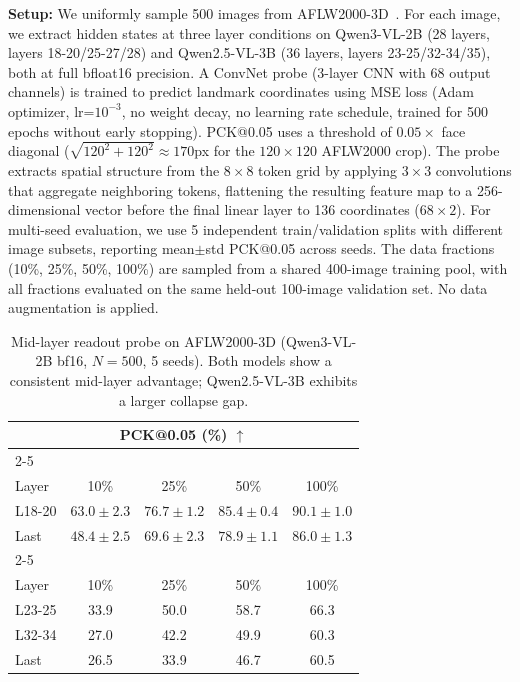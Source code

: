 \documentclass[10pt,twocolumn,letterpaper]{article}
\begin{document}
\textbf{Setup:} We uniformly sample 500 images from AFLW2000-3D~\cite{Zhu2019face}. For each image, we extract hidden states at three layer conditions on Qwen3-VL-2B (28 layers, layers 18-20/25-27/28) and Qwen2.5-VL-3B (36 layers, layers 23-25/32-34/35), both at full bfloat16 precision. A ConvNet probe (3-layer CNN with 68 output channels) is trained to predict landmark coordinates using MSE loss (Adam optimizer, lr=$10^{-3}$, no weight decay, no learning rate schedule, trained for 500 epochs without early stopping). PCK@0.05 uses a threshold of $0.05\times$ face diagonal ($\sqrt{120^2+120^2} \approx 170$px for the $120\times120$ AFLW2000 crop). The probe extracts spatial structure from the $8\times8$ token grid by applying $3\times3$ convolutions that aggregate neighboring tokens, flattening the resulting feature map to a 256-dimensional vector before the final linear layer to 136 coordinates ($68\times2$). For multi-seed evaluation, we use 5 independent train/validation splits with different image subsets, reporting mean$\pm$std PCK@0.05 across seeds. The data fractions (10\%, 25\%, 50\%, 100\%) are sampled from a shared 400-image training pool, with all fractions evaluated on the same held-out 100-image validation set. No data augmentation is applied.

\begin{table}[t]
\centering
\small
\setlength{\tabcolsep}{3pt}
\caption{Mid-layer readout probe on AFLW2000-3D (Qwen3-VL-2B bf16, $N=500$, 5 seeds). Both models show a consistent mid-layer advantage; Qwen2.5-VL-3B exhibits a larger collapse gap.}
\label{tab:probe}
\begin{tabular}{lcccc}
\toprule
\multicolumn{5}{c}{\textbf{PCK@0.05 (\%) $\uparrow$}} \\
\cmidrule(lr){2-5}
\multicolumn{5}{c}{Qwen3-VL-2B} \\
Layer & 10\% & 25\% & 50\% & 100\% \\
\midrule
L18-20 & $63.0\pm2.3$ & $76.7\pm1.2$ & $85.4\pm0.4$ & $90.1\pm1.0$ \\
Last & $48.4\pm2.5$ & $69.6\pm2.3$ & $78.9\pm1.1$ & $86.0\pm1.3$ \\
\cmidrule(lr){2-5}
\multicolumn{5}{c}{Qwen2.5-VL-3B} \\
Layer & 10\% & 25\% & 50\% & 100\% \\
\midrule
L23-25 & 33.9 & 50.0 & 58.7 & 66.3 \\
L32-34 & 27.0 & 42.2 & 49.9 & 60.3 \\
Last & 26.5 & 33.9 & 46.7 & 60.5 \\
\bottomrule
\end{tabular}
\end{table}
\end{document}
